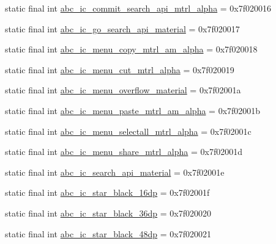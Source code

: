 \begin{CompactItemize}
\item 
static final int \hyperlink{classandroid_1_1support_1_1v4_1_1_r_1_1drawable_c0866463ad15c99aac07a336a346dacf}{abc\_\-ic\_\-commit\_\-search\_\-api\_\-mtrl\_\-alpha} = 0x7f020016
\item 
static final int \hyperlink{classandroid_1_1support_1_1v4_1_1_r_1_1drawable_a9105b66a260bd13a29beb788104cd8f}{abc\_\-ic\_\-go\_\-search\_\-api\_\-material} = 0x7f020017
\item 
static final int \hyperlink{classandroid_1_1support_1_1v4_1_1_r_1_1drawable_8760c816c48c983e8f6396303f602bb1}{abc\_\-ic\_\-menu\_\-copy\_\-mtrl\_\-am\_\-alpha} = 0x7f020018
\item 
static final int \hyperlink{classandroid_1_1support_1_1v4_1_1_r_1_1drawable_dcc9c0f182827928f705a370426bae69}{abc\_\-ic\_\-menu\_\-cut\_\-mtrl\_\-alpha} = 0x7f020019
\item 
static final int \hyperlink{classandroid_1_1support_1_1v4_1_1_r_1_1drawable_1505a13e0a09f1efaaa9e6ca4431b30d}{abc\_\-ic\_\-menu\_\-overflow\_\-material} = 0x7f02001a
\item 
static final int \hyperlink{classandroid_1_1support_1_1v4_1_1_r_1_1drawable_2423bb7debeaf13c78571467d1b43eae}{abc\_\-ic\_\-menu\_\-paste\_\-mtrl\_\-am\_\-alpha} = 0x7f02001b
\item 
static final int \hyperlink{classandroid_1_1support_1_1v4_1_1_r_1_1drawable_a7079196132361fc3401972fc175265b}{abc\_\-ic\_\-menu\_\-selectall\_\-mtrl\_\-alpha} = 0x7f02001c
\item 
static final int \hyperlink{classandroid_1_1support_1_1v4_1_1_r_1_1drawable_8bb880271d5321355693c6e1a66b9ac4}{abc\_\-ic\_\-menu\_\-share\_\-mtrl\_\-alpha} = 0x7f02001d
\item 
static final int \hyperlink{classandroid_1_1support_1_1v4_1_1_r_1_1drawable_c4d6ef8efad678ba79525d48ac8c5586}{abc\_\-ic\_\-search\_\-api\_\-material} = 0x7f02001e
\item 
static final int \hyperlink{classandroid_1_1support_1_1v4_1_1_r_1_1drawable_1c72227f37c07352f1b152957a6a1949}{abc\_\-ic\_\-star\_\-black\_\-16dp} = 0x7f02001f
\item 
static final int \hyperlink{classandroid_1_1support_1_1v4_1_1_r_1_1drawable_024d702b4b053fd43b9cc1051e5a6c83}{abc\_\-ic\_\-star\_\-black\_\-36dp} = 0x7f020020
\item 
static final int \hyperlink{classandroid_1_1support_1_1v4_1_1_r_1_1drawable_464f4c6a9e51cf577123cb35a2b4e14c}{abc\_\-ic\_\-star\_\-black\_\-48dp} = 0x7f020021
\item 

\end{CompactItemize}
